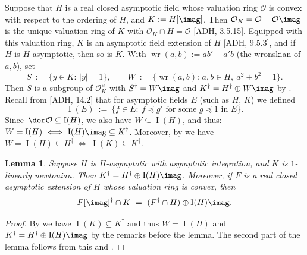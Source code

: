\documentclass[]{amsart}
\numberwithin{equation}{section}
\def \I{\operatorname{I}}
\def \wr {\operatorname{wr}}
\newtheorem{lemma}[theorem]{Lemma}
\theoremstyle{definition}
\theoremstyle{remark}
\renewcommand\preceq{\preccurlyeq}
\begin{document}
\noindent
Suppose that $H$ is a real closed asymptotic field whose valuation ring $\mathcal{O}$ is convex with respect to the ordering of $H$, 
and $K:=H[\imag]$. Then $\mathcal{O}_K=\mathcal{O}+\mathcal{O}\imag$ is the unique valuation ring of $K$ with $\mathcal O_K\cap H=\mathcal O$
[ADH, 3.5.15].
Equipped with this valuation ring, $K$ is an asymptotic field
extension of $H$ [ADH,  9.5.3], and if $H$ is $H$-asymptotic, then so is $K$.
With $\wr(a,b):=ab'-a'b$ (the wronskian of $a,b$), set
$$S\ :=\ \big\{y\in K:\, |y|=1\big\}, \qquad
W\ :=\ \big\{\!\wr(a,b):\, a,b\in H,\ a^2+b^2=1\big\}.$$ 
Then $S$ is a subgroup of $\mathcal{O}_K^\times$ with $S^\dagger = W\imag$ and 
$K^\dagger=H^\dagger\oplus W\imag$ by \cite[Lemma~1.2.4]{ADH4}. Recall from [ADH, 14.2] that for 
asymptotic fields $E$ (such as $H$, $K$) we defined $$\I(E)\ :=\ \{f\in E:\ f\preceq g' \text{ for some }g\preceq 1 \text{ in }E\}.$$  
Since~$\der\mathcal O\subseteq \I(H)$,  
we also have $W\subseteq \I(H)$, and thus: $W = \I(H) \ \Longleftrightarrow\  \I(H)\imag\subseteq K^\dagger$. 
Moreover, by \cite[Lemma~1.2.13]{ADH4} we have 
$W=\I(H)\subseteq H^\dagger \ \Longleftrightarrow\ 
\I(K)\subseteq K^\dagger$.


\begin{lemma}\label{lem:logder real closed}
Suppose $H$ is $H$-asymptotic with asymptotic integration, and $K$ is $1$-linearly newtonian. Then $K^\dagger=H^\dagger\oplus\I(H)\imag$.
Moreover, if $F$ is   a real closed asymptotic extension of $H$ whose valuation ring is convex,  
then $$F[\imag]^\dagger\cap K\ =\ (F^\dagger\cap H)\oplus\I(H)\imag.$$ 
\end{lemma}

\begin{proof}
By \cite[Corollary~1.2.14]{ADH4} we have $\I(K)\subseteq K^\dagger$ and thus $W=\I(H)$ and  $K^\dagger=H^\dagger\oplus\I(H)\imag$ by the remarks before the lemma. The second part of the lemma follows from this and \cite[Corollary~1.2.15]{ADH4}.
\end{proof}
 
\end{document}

